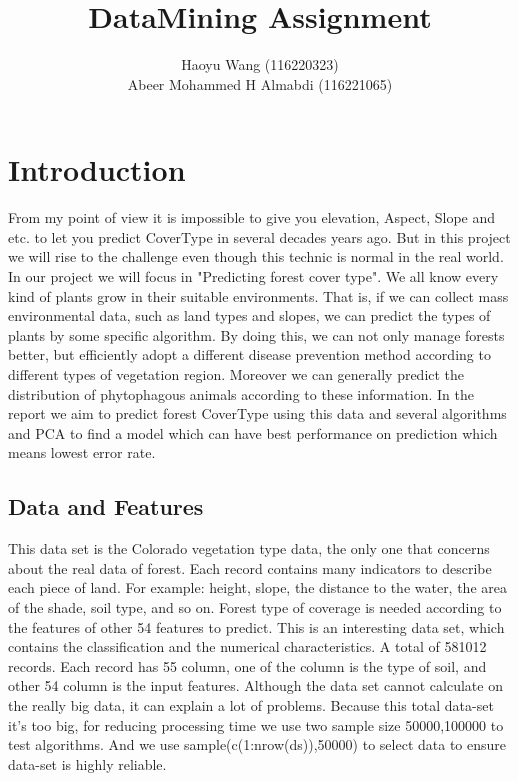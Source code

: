 \documentclass{article}\usepackage[]{graphicx}\usepackage[]{color}
\title{DataMining Assignment}
\author{Haoyu Wang (116220323)\\
Abeer Mohammed H Almabdi (116221065)}
\begin{document}
	
    \maketitle
	\tableofcontents
	\newpage
	\section{Introduction}
	\noindent	From my point of view it is impossible to give you elevation, Aspect, Slope and etc. to let you predict CoverType in several decades years ago. But in this project we will rise to the challenge even though this technic is normal in the real world. 
	\noindent	In our project we will focus in "Predicting forest cover type". We all know every kind of plants grow in their suitable environments. 
	That is, if we can collect mass environmental data, such as land types and slopes, we can predict the types of plants by some specific algorithm.
	By doing this, we can not only manage forests better, but efficiently adopt a different disease prevention method according to different types of vegetation region.	
	Moreover we can generally predict the distribution of phytophagous animals according to these information.
	\noindent	In the report we aim to predict forest CoverType using this data and several algorithms and PCA to find a model which can have best performance on prediction which means lowest error rate.\\
	\subsection{Data and Features}
	\noindent	This data set is the Colorado vegetation type data, the only one that concerns about the real data of forest. Each record contains many indicators to describe each piece of land. For example: height, slope, 
	the distance to the water, the area of the shade, soil type, and so on. Forest type of coverage is needed according to the features of other 54 features to predict.
	This is an interesting data set, which contains the classification and the numerical characteristics. A total of 581012 records. Each record has 55 column, one of the column is the type of soil, and other 54 column is the input features.
	Although the data set cannot calculate on the really big data, it can explain a lot of problems. Because this total data-set it’s too big, for reducing processing time we use two sample size 50000,100000 to test algorithms. 
	And we use sample(c(1:nrow(ds)),50000) to select data to ensure data-set is highly reliable.\\
\end{document}
